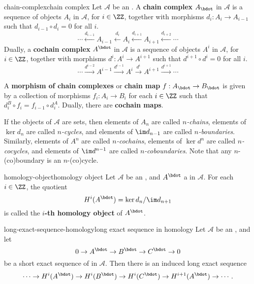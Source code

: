 \begin{topic}{chain-complex}{chain complex}
    Let $\mathcal{A}$ be an . A \textbf{chain complex} $A_\bdot$ in $\mathcal{A}$ is a sequence of objects $A_i$ in $\mathcal{A}$, for $i \in \ZZ$, together with morphisms $d_i : A_i \to A_{i - 1}$ such that $d_{i - 1} \circ d_i = 0$ for all $i$.
    \[ \cdots \xleftarrow{d_{i - 1}} A_{i - 1} \xleftarrow{d_i} A_i \xleftarrow{d_{i + 1}} A_{i + 1} \xleftarrow{d_{i + 2}} \cdots \]
    Dually, a \textbf{cochain complex} $A^\bdot$ in $\mathcal{A}$ is a sequence of objects $A^i$ in $\mathcal{A}$, for $i \in \ZZ$, together with morphisms $d^i : A^i \to A^{i + 1}$ such that $d^{i + 1} \circ d^i = 0$ for all $i$.
    \[ \cdots \xrightarrow{d^{i - 2}} A^{i - 1} \xrightarrow{d^{i - 1}} A^i \xrightarrow{d^i} A^{i + 1} \xrightarrow{d^{i + 1}} \cdots \]
    
    A \textbf{morphism of chain complexes} or \textbf{chain map} $f : A_\bdot \to B_\bdot$ is given by a collection of morphisms $f_i : A_i \to B_i$ for each $i \in \ZZ$ such that $d^B_i \circ f_i = f_{i - 1} \circ d^A_i$. Dually, there are \textbf{cochain maps}.
    
    If the objects of $\mathcal{A}$ are sets, then elements of $A_n$ are called \textit{$n$-chains}, elements of $\ker d_n$ are called \textit{$n$-cycles}, and elements of $\im d_{n - 1}$ are called \textit{$n$-boundaries}. Similarly, elements of $A^n$ are called \textit{$n$-cochains}, elements of $\ker d^n$ are called \textit{$n$-cocycles}, and elements of $\im d^{n - 1}$ are called \textit{$n$-coboundaries}. Note that any $n$-(co)boundary is an $n$-(co)cycle.
\end{topic}

\begin{topic}{homology-object}{homology object}
    Let $\mathcal{A}$ be an , and $A^\bdot$ a  in $\mathcal{A}$. For each $i \in \ZZ$, the quotient
    \[ H^i(A^\bdot) = \ker d_n / \im d_{n + 1} \]
    is called the \textbf{$i$-th homology object} of $A^\bdot$.
\end{topic}

\begin{topic}{long-exact-sequence-homology}{long exact sequence in homology}
    Let $\mathcal{A}$ be an , and let
    \[ 0 \rightarrow A^\bdot \rightarrow B^\bdot \rightarrow C^\bdot \rightarrow 0 \]
    be a short exact sequence of  in $\mathcal{A}$. Then there is an induced long exact sequence
    \[ \cdots \rightarrow H^i(A^\bdot) \rightarrow H^i(B^\bdot) \rightarrow H^i(C^\bdot) \rightarrow H^{i + 1}(A^\bdot) \rightarrow \cdots . \]
\end{topic}

